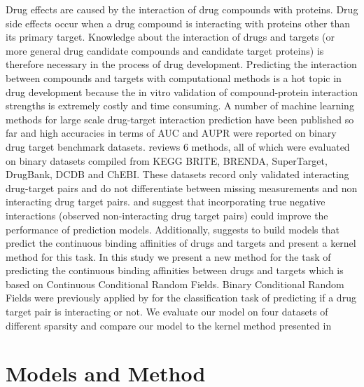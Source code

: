 \documentclass[
journal=jacsat, %
manuscript=article]{achemso}
\begin{document}
Drug effects are caused by the interaction of drug compounds with proteins. Drug side effects occur when a drug compound is interacting with proteins other than its primary target. 
Knowledge about the interaction of drugs and targets (or more general drug candidate compounds and candidate target proteins) is therefore necessary in the process of drug development. Predicting the interaction between compounds and targets with computational methods is a hot topic in drug development because the in vitro validation of compound-protein interaction strengths is extremely costly and time consuming. A number of machine learning methods for large scale drug-target interaction prediction have been published so far and high accuracies in terms of AUC and AUPR were reported on binary drug target benchmark datasets. \citeauthor{ding2013similarity} reviews 6 methods, all of which were evaluated on binary datasets compiled from KEGG BRITE, BRENDA, SuperTarget, DrugBank, DCDB and ChEBI. These datasets record only validated interacting drug-target pairs and do not differentiate between missing measurements and non interacting drug target pairs. \citeauthor{ding2013similarity} and  \citeauthor{pahikkala2014toward} suggest that incorporating true negative interactions (observed non-interacting drug target pairs) could improve the performance of prediction models. Additionally, \citeauthor{pahikkala2014toward} suggests to build models that predict the continuous binding affinities of drugs and targets and present a kernel method for this task. In this study we present a new method for the task of predicting the continuous binding affinities between drugs and targets which is based on Continuous Conditional Random Fields. Binary Conditional Random Fields were previously applied by \citeauthor{yang2013drug} for the classification task of predicting if a drug target pair is interacting or not. We evaluate our model on four datasets of different sparsity and compare our model to the kernel method presented in \citeauthor{pahikkala2014toward} 


\section{Models and Method}
\end{document}
